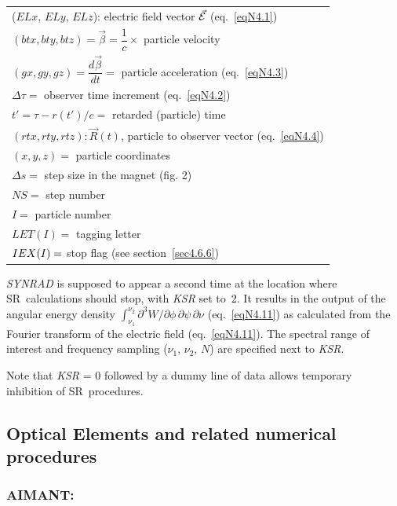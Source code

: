  \begin{tabular}{l} 
 ($ELx$, $ELy$, $ELz$):  electric field vector $\vec{\mathcal{E}} $ 
 						(eq.~\ref{eqN4.1}) \\
 $(btx, bty, btz) = \vec\beta= \dfrac{1}{c} \times$ particle velocity \\
$(gx, gy, gz) = \dfrac{d\vec\beta}{dt} =$ particle acceleration (eq.~\ref{eqN4.3}) \\					
$\Delta \tau =$ observer time increment (eq.~\ref{eqN4.2}) \\
$t' = \tau  - r(t')/c = $ retarded (particle) time \\
$(rtx, rty, rtz) : \vec R(t)$, particle to observer vector (eq.~\ref{eqN4.4}) \\
$(x, y, z) =$ particle coordinates\\
$\Delta s = $ step size in the magnet (fig. 2)\\
$NS=$ step number\\
$I=$ particle number\\
$LET(I)=$ tagging letter\\
$IEX(I)\index{IEX@{\IEX}}=$ stop flag (see section~\ref{sec4.6.6}) 
\end{tabular}
\bigskip


\noindent\textsl{SYNRAD} is supposed to appear a second time at the 
location where SR~calculations should stop, with \textsl{KSR} set 
to~2. It results in the output of the angular energy density 
$\int_{\nu_1}^{\nu_2} \partial^3 W / \partial \phi \, \partial \psi 
\, \partial \nu$ (eq.~\ref{eqN4.11}) as calculated from the Fourier transform 
of the electric field (eq.~\ref{eqN4.11}). The spectral range of 
interest and frequency sampling ($\nu_1$, $\nu_2$, $N$) are specified 
next to \textsl{KSR}.
\bigskip

\noindent Note that \textsl{KSR} = 0 followed by a dummy line of 
data allows temporary inhibition of SR~procedures.

\newpage

\subsection{Optical Elements and related numerical procedures} \label{sec4.4}

\subsubsection*{AIMANT:  \AIMANTTitl}\label{AIMANT}
\medskip

